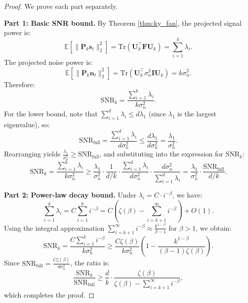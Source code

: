 \documentclass[preprint,12pt]{elsarticle}
\begin{document}
\begin{proof}
We prove each part separately.

\textbf{Part 1: Basic SNR bound.} By Theorem \ref{thm:ky_fan}, the projected signal power is:
\begin{equation}
\mathbb{E}\left[\|\mathbf{P}_k \mathbf{s}_t\|_2^2\right] = \text{Tr}(\mathbf{U}_k^\top \mathbf{F} \mathbf{U}_k) = \sum_{i=1}^{k} \lambda_i.
\end{equation}
The projected noise power is:
\begin{equation}
\mathbb{E}\left[\|\mathbf{P}_k \mathbf{n}_t\|_2^2\right] = \text{Tr}(\mathbf{U}_k^\top \sigma_n^2 \mathbf{I} \mathbf{U}_k) = k \sigma_n^2.
\end{equation}
Therefore:
\begin{equation}
\text{SNR}_k = \frac{\sum_{i=1}^{k} \lambda_i}{k \sigma_n^2}.
\end{equation}
For the lower bound, note that $\sum_{i=1}^{d} \lambda_i \leq d \lambda_1$ (since $\lambda_1$ is the largest eigenvalue), so:
\begin{equation}
\text{SNR}_{\text{full}} = \frac{\sum_{i=1}^{d} \lambda_i}{d \sigma_n^2} \leq \frac{d \lambda_1}{d \sigma_n^2} = \frac{\lambda_1}{\sigma_n^2}.
\end{equation}
Rearranging yields $\frac{\lambda_1}{\sigma_n^2} \geq \text{SNR}_{\text{full}}$, and substituting into the expression for $\text{SNR}_k$:
\begin{equation}
\text{SNR}_k = \frac{\sum_{i=1}^{k} \lambda_i}{k \sigma_n^2} \geq \frac{\lambda_1}{\sigma_n^2} \cdot \frac{1}{d/k} \cdot \frac{\sum_{i=1}^{d} \lambda_i}{d \sigma_n^2} \cdot \frac{d \sigma_n^2}{\sum_{i=1}^{d} \lambda_i} = \frac{\lambda_1}{\sigma_n^2} \cdot \frac{\text{SNR}_{\text{full}}}{d/k}.
\end{equation}

\textbf{Part 2: Power-law decay bound.} Under $\lambda_i = C \cdot i^{-\beta}$, we have:
\begin{equation}
\sum_{i=1}^{k} \lambda_i = C \sum_{i=1}^{k} i^{-\beta} = C (\zeta(\beta) - \sum_{i=k+1}^{\infty} i^{-\beta}) + O(1).
\end{equation}
Using the integral approximation $\sum_{i=k+1}^{\infty} i^{-\beta} \approx \frac{k^{1-\beta}}{\beta - 1}$ for $\beta > 1$, we obtain:
\begin{equation}
\text{SNR}_k = \frac{C \sum_{i=1}^{k} i^{-\beta}}{k \sigma_n^2} \geq \frac{C \zeta(\beta)}{k \sigma_n^2} \left(1 - \frac{k^{1-\beta}}{(\beta - 1)\zeta(\beta)}\right).
\end{equation}
Since $\text{SNR}_{\text{full}} = \frac{C \zeta(\beta)}{d \sigma_n^2}$, the ratio is:
\begin{equation}
\frac{\text{SNR}_k}{\text{SNR}_{\text{full}}} \geq \frac{d}{k} \cdot \frac{\zeta(\beta)}{\zeta(\beta) - \sum_{i=k+1}^{\infty} i^{-\beta}},
\end{equation}
which completes the proof.
\end{proof}
\end{document}
